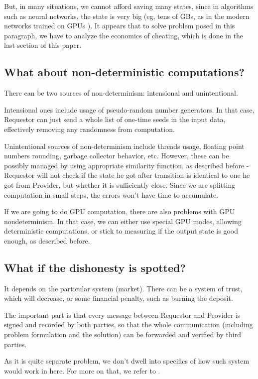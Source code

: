 \documentclass{winnower}
\begin{document}
But, in many situations, we cannot afford saving many states, since in algorithms such as neural networks, the state is very big (eg, tens of GBs, as in the modern networks trained on GPUs \citep{biggpus}).
It appears that to solve problem posed in this paragraph, we have to analyze the economics of cheating, which is done in the last section of this paper.

\subsection{What about non-deterministic computations?}
There can be two sources of non-determinism: intensional and unintentional.

Intensional ones include usage of pseudo-random number generators. In that case, Requestor can just send a whole list of one-time seeds in the input data, effectively removing any randomness from computation.

Unintentional sources of non-determinism include threads usage, floating point numbers rounding, garbage collector behavior, etc. However, these can be possibly managed by using appropriate similarity function, as described before - Requestor will not check if the state he got after transition is identical to one he got from Provider, but whether it is sufficiently close. Since we are splitting computation in small steps, the errors won't have time to accumulate.

If we are going to do GPU computation, there are also problems with GPU nondeterminism. In that case, we can either use special GPU modes, allowing deterministic computations, or stick to measuring if the output state is good enough, as described before.

\subsection{What if the dishonesty is spotted?}
It depends on the particular system (market). There can be a system of trust, which will decrease, or some financial penalty, such as burning the deposit.

The important part is that every message between Requestor and Provider is signed and recorded by both parties, so that the whole communication (including problem formulation and the solution) can be forwarded and verified by third parties.

As it is quite separate problem, we don't dwell into specifics of how such system would work in here. For more on that, we refer to \citep{enforcinghonesty}. 
\end{document}
